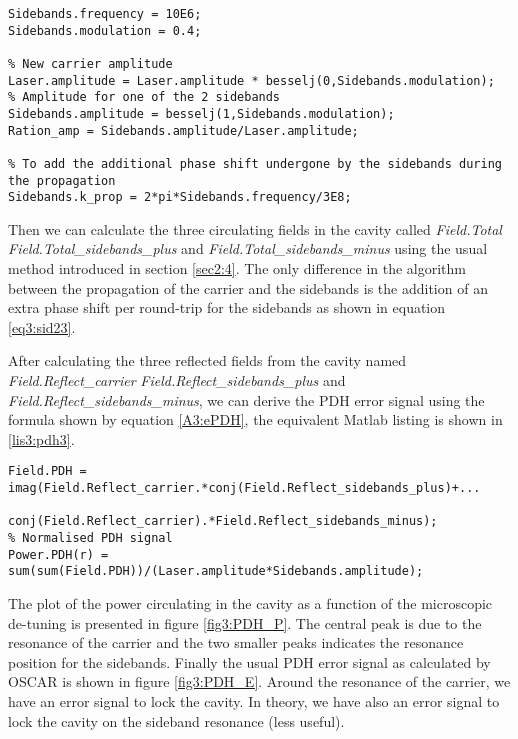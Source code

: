 \begin{lstlisting}[float=btp,caption=New variables to define the sidebands frequency and amplitude \label{lis3:SB},frame=lines]
% Frequency of the sidebands in Hertz and modulation index
Sidebands.frequency = 10E6;
Sidebands.modulation = 0.4;

% New carrier amplitude
Laser.amplitude = Laser.amplitude * besselj(0,Sidebands.modulation);
% Amplitude for one of the 2 sidebands
Sidebands.amplitude = besselj(1,Sidebands.modulation);
Ration_amp = Sidebands.amplitude/Laser.amplitude;

% To add the additional phase shift undergone by the sidebands during the propagation
Sidebands.k_prop = 2*pi*Sidebands.frequency/3E8;
\end{lstlisting}

Then we can calculate the three circulating fields in the cavity called \textsl{Field.Total} \textsl{Field.Total\_sidebands\_plus} and \textsl{Field.Total\_sidebands\_minus} using the usual method introduced in section \ref{sec2:4}. The only difference in the algorithm between the propagation of the carrier and the sidebands is the addition of an extra phase shift per round-trip for the sidebands as shown in equation \ref{eq3:sid23}.

After calculating the three reflected fields from the cavity named \textsl{Field.Reflect\_carrier} \textsl{Field.Reflect\_sidebands\_plus} and \textsl{Field.Reflect\_sidebands\_minus}, we can derive the PDH error signal using the formula shown by equation \ref{A3:ePDH}, the equivalent Matlab listing is shown in \ref{lis3:pdh3}.\\

\begin{lstlisting}[float=btp,caption=Calculating the PDH error signals from the fields reflected by the cavity \label{lis3:pdh3},frame=lines]
Field.PDH = imag(Field.Reflect_carrier.*conj(Field.Reflect_sidebands_plus)+...
            conj(Field.Reflect_carrier).*Field.Reflect_sidebands_minus);
% Normalised PDH signal
Power.PDH(r) = sum(sum(Field.PDH))/(Laser.amplitude*Sidebands.amplitude);
\end{lstlisting}

The plot of the power circulating in the cavity as a function of the microscopic de-tuning is presented in figure \ref{fig3:PDH_P}. The central peak is due to the resonance of the carrier and the two smaller peaks indicates the resonance position for the sidebands. Finally the usual PDH error signal as calculated by OSCAR is shown in figure \ref{fig3:PDH_E}. Around the resonance of the carrier, we have an error signal to lock the cavity. In theory, we have also an error signal to lock the cavity on the sideband resonance (less useful).

